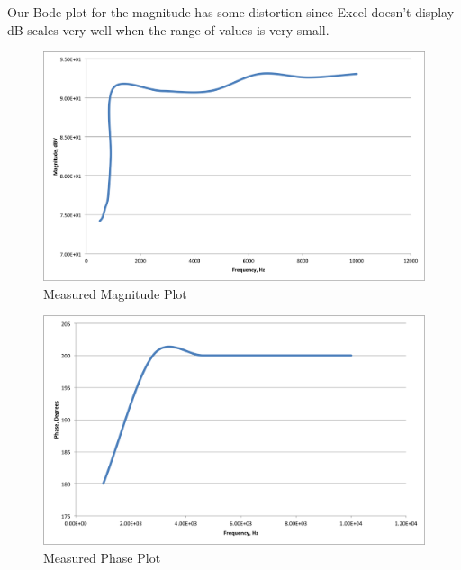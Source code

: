 \documentclass[11pt, twoside, letterpaper]{article}
\begin{document}
Our Bode plot for the magnitude has some distortion since Excel doesn't display dB scales very well when the range of values is very small.
\begin{figure}[htbp]
\begin{center}
\includegraphics[width=7in]{measuredmag.png}
\caption{Measured Magnitude Plot}
\end{center}
\end{figure}
\FloatBarrier

\newpage
\begin{figure}[htbp]
\begin{center}
\includegraphics[width=7in]{measuredphase.png}
\caption{Measured Phase Plot}
\end{center}
\end{figure}
\FloatBarrier

\newpage
\end{document}
